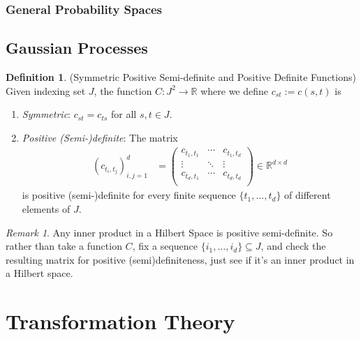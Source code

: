 \documentclass[12pt]{article}
\theoremstyle{plain}
\theoremstyle{definition}
\newtheorem{defn}[thm]{Definition}
\theoremstyle{remark}
\newtheorem*{rmk}{Remark}
\newcommand{\ra}{\rightarrow}
\newcommand{\R}{\mathbb{R}}
\begin{document}
\subsubsection{General Probability Spaces}


\subsection{Gaussian Processes}

\begin{defn}
(Symmetric Positive Semi-definite and Positive Definite Functions)
Given indexing set $J$, the function $C:J^2 \ra \R$ where we define
$c_{st}:=c(s,t)$ is
\begin{enumerate}
  \item \emph{Symmetric}: $c_{st}=c_{ts}$ for all $s,t \in J$.
  \item \emph{Positive (Semi-)definite}: The matrix
    \begin{align*}
      (c_{t_i,t_j})^d_{i,j=1}
      &=
      \begin{pmatrix}
        c_{t_1,t_1} &\cdots & c_{t_1,t_d} \\
        \vdots &\ddots & \vdots \\
        c_{t_d,t_1} &\cdots & c_{t_d,t_d} \\
      \end{pmatrix}
      \in \R^{d\times d}
    \end{align*}
    is positive (semi-)definite for every finite sequence
    $\{t_1,\ldots,t_d\}$ of different elements of $J$.
\end{enumerate}
\end{defn}

\begin{rmk}
Any inner product in a Hilbert Space is positive semi-definite. So
rather than take a function $C$, fix a sequence
$\{i_1,\ldots,i_d\}\subseteq J$, and check the resulting matrix for
positive (semi)definiteness, just see if it's an inner product in a
Hilbert space.
\end{rmk}





\clearpage
\section{Transformation Theory}
\end{document}
